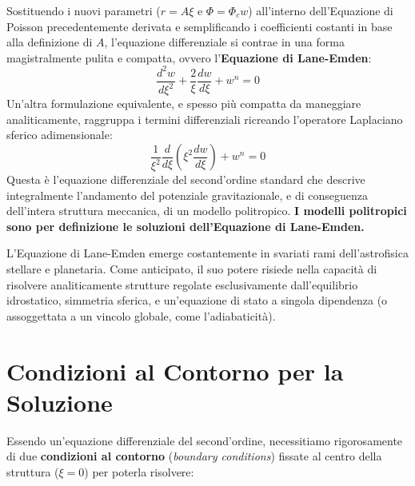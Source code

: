Sostituendo i nuovi parametri ($r = A \xi$ e $\Phi = \Phi_c w$) all'interno dell'Equazione di Poisson precedentemente derivata e semplificando i coefficienti costanti in base alla definizione di $A$, l'equazione differenziale si contrae in una forma magistralmente pulita e compatta, ovvero l'\textbf{Equazione di Lane-Emden}:
\begin{equation}
\frac{d^2w}{d\xi^2} + \frac{2}{\xi} \frac{dw}{d\xi} + w^n = 0
\end{equation}
Un'altra formulazione equivalente, e spesso più compatta da maneggiare analiticamente, raggruppa i termini differenziali ricreando l'operatore Laplaciano sferico adimensionale:
\begin{equation}
\frac{1}{\xi^2} \frac{d}{d\xi} \left( \xi^2 \frac{dw}{d\xi} \right) + w^n = 0
\end{equation}
Questa è l'equazione differenziale del second'ordine standard che descrive integralmente l'andamento del potenziale gravitazionale, e di conseguenza dell'intera struttura meccanica, di un modello politropico. \textbf{I modelli politropici sono per definizione le soluzioni dell'Equazione di Lane-Emden.}

L'Equazione di Lane-Emden emerge costantemente in svariati rami dell'astrofisica stellare e planetaria. Come anticipato, il suo potere risiede nella capacità di risolvere analiticamente strutture regolate esclusivamente dall'equilibrio idrostatico, simmetria sferica, e un'equazione di stato a singola dipendenza (o assoggettata a un vincolo globale, come l'adiabaticità).

\section{Condizioni al Contorno per la Soluzione}

Essendo un'equazione differenziale del second'ordine, necessitiamo rigorosamente di due \textbf{condizioni al contorno} (\textit{boundary conditions}) fissate al centro della struttura ($\xi = 0$) per poterla risolvere:

